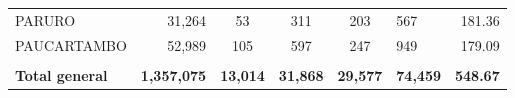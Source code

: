 \begin{tabular}{lrccclr}
		\cellcolor[HTML]{C6E0B4}PARURO                                 & 31,264                                                         & 53                                                          & 311                  & 203                      & 567                                                                 & 181.36                                                                       \\
		\cellcolor[HTML]{C6E0B4}PAUCARTAMBO                            & 52,989                                                         & 105                                                         & 597                  & 247                      & 949                                                                 & 179.09                                                                       \\
		& \multicolumn{1}{l}{}                                           & \multicolumn{1}{l}{}                                        & \multicolumn{1}{l}{} & \multicolumn{1}{l}{}     &                                                                     & \multicolumn{1}{l}{}                                                         \\
		\rowcolor[HTML]{DDEBF7} 
		\textbf{Total   general}                                       & \textbf{1,357,075}                                             & \multicolumn{1}{r}{\cellcolor[HTML]{DDEBF7}\textbf{13,014}} & \textbf{31,868}      & \textbf{29,577}          & \textbf{74,459}                                                     & \textbf{548.67}                                                             
	\end{tabular}